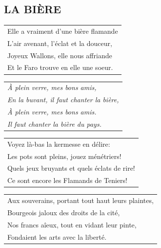 \documentclass{article}
\begin{document}
\subsection*{LA BIÈRE
}
\begin{flushleft}
\begin{tabularx}{0.8\textwidth} {
   >{\raggedright\arraybackslash}X}
Elle a vraiment d’une bière flamande \\
L’air avenant, l’éclat et la douceur, \\
Joyeux Wallons, elle nous affriande \\
Et le Faro trouve en elle une soeur. \\
\end{tabularx}
\end{flushleft}
\begin{flushleft}
\begin{tabularx}{0.8\textwidth} {
   >{\raggedright\arraybackslash}X}
\textit{À plein verre, mes bons amis,} \\
\textit{En la buvant, il faut chanter la bière,} \\
\textit{À plein verre, mes bons amis.} \\
\textit{Il faut chanter la bière du pays.} \\
\end{tabularx}
\end{flushleft}
\begin{flushleft}
\begin{tabularx}{0.8\textwidth} {
   >{\raggedright\arraybackslash}X}
Voyez là-bas la kermesse en délire: \\
Les pots sont pleins, jouez ménétriers!\\
Quels jeux bruyants et quels éclats de rire!\\
Ce sont encore les Flamands de Teniers!\\
\end{tabularx}
\end{flushleft}
\begin{flushleft}
\begin{tabularx}{0.8\textwidth} {
   >{\raggedright\arraybackslash}X}
Aux souverains, portant tout haut leurs plaintes, \\
Bourgeois jaloux des droits de la cité, \\
Nos francs aîeux, tout en vidant leur pinte, \\
Fondaient les arts avec la liberté. \\
\end{tabularx}
\end{flushleft}
\end{document}
